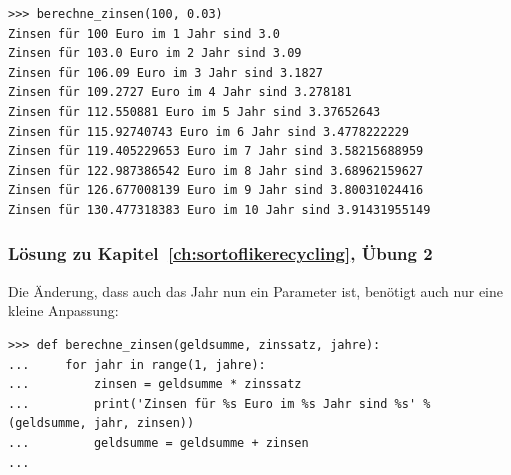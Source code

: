 \begin{Verbatim}[frame=single]
>>> berechne_zinsen(100, 0.03)
Zinsen für 100 Euro im 1 Jahr sind 3.0
Zinsen für 103.0 Euro im 2 Jahr sind 3.09
Zinsen für 106.09 Euro im 3 Jahr sind 3.1827
Zinsen für 109.2727 Euro im 4 Jahr sind 3.278181
Zinsen für 112.550881 Euro im 5 Jahr sind 3.37652643
Zinsen für 115.92740743 Euro im 6 Jahr sind 3.4778222229
Zinsen für 119.405229653 Euro im 7 Jahr sind 3.58215688959
Zinsen für 122.987386542 Euro im 8 Jahr sind 3.68962159627
Zinsen für 126.677008139 Euro im 9 Jahr sind 3.80031024416
Zinsen für 130.477318383 Euro im 10 Jahr sind 3.91431955149
\end{Verbatim}


\noindent
\subsubsection{Lösung zu Kapitel~\ref{ch:sortoflikerecycling}, Übung 2}
Die Änderung, dass auch das Jahr nun ein Parameter ist, benötigt auch nur eine kleine Anpassung:

\begin{Verbatim}[frame=single]
>>> def berechne_zinsen(geldsumme, zinssatz, jahre):
...     for jahr in range(1, jahre):
...         zinsen = geldsumme * zinssatz
...         print('Zinsen für %s Euro im %s Jahr sind %s' % (geldsumme, jahr, zinsen))
...         geldsumme = geldsumme + zinsen
...
\end{Verbatim}

